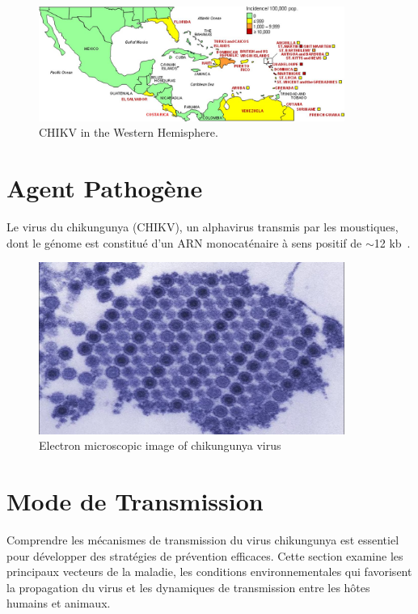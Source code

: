 \begin{figure}[!h]
	\begin{center}
		\includegraphics[width=10cm]{images/zjv9990995820001}
	\end{center}
	\caption{CHIKV in the Western Hemisphere.}
	\label{fig:chikvwestern}
\end{figure}

\section{Agent Pathogène}
Le virus du chikungunya (CHIKV), un alphavirus transmis par les moustiques, dont le génome est constitué d'un ARN monocaténaire à sens positif de $\sim$12 kb~\cite{JournalofVirology}.
\begin{figure}[!h]
	\begin{center}
		\includegraphics[width=10cm]{images/CHIK_17550_TEM}
	\end{center}
	\caption{Electron microscopic image of chikungunya virus}
	\label{fig:chikv} 
\end{figure}

\section{Mode de Transmission}
Comprendre les mécanismes de transmission du virus chikungunya est essentiel pour développer des stratégies de prévention efficaces. Cette section examine les principaux vecteurs de la maladie, les conditions environnementales qui favorisent la propagation du virus et les dynamiques de transmission entre les hôtes humains et animaux.
